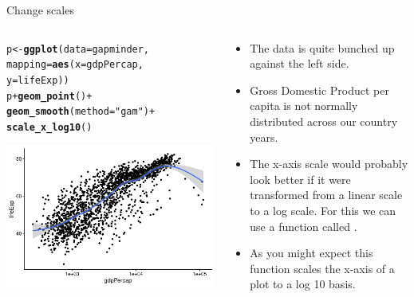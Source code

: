\documentclass[10pt,handout]{beamer}\usepackage[]{graphicx}\usepackage[]{color}
\makeatletter
\def\maxwidth{ %
  \ifdim\Gin@nat@width>\linewidth
    \linewidth
  \else
    \Gin@nat@width
  \fi
}
\newcommand{\hlstr}[1]{\textcolor[rgb]{0.192,0.494,0.8}{#1}}%
\newcommand{\hlopt}[1]{\textcolor[rgb]{0,0,0}{#1}}%
\newcommand{\hlstd}[1]{\textcolor[rgb]{0.345,0.345,0.345}{#1}}%
\newcommand{\hlkwb}[1]{\textcolor[rgb]{0.69,0.353,0.396}{#1}}%
\newcommand{\hlkwc}[1]{\textcolor[rgb]{0.333,0.667,0.333}{#1}}%
\newcommand{\hlkwd}[1]{\textcolor[rgb]{0.737,0.353,0.396}{\textbf{#1}}}%
\newenvironment{kframe}{%
 \def\at@end@of@kframe{}%
 \ifinner\ifhmode%
  \def\at@end@of@kframe{\end{minipage}}%
  \begin{minipage}{\columnwidth}%
 \fi\fi%
 \def\FrameCommand##1{\hskip\@totalleftmargin \hskip-\fboxsep
 \colorbox{shadecolor}{##1}\hskip-\fboxsep
     \hskip-\linewidth \hskip-\@totalleftmargin \hskip\columnwidth}%
 \MakeFramed {\advance\hsize-\width
   \@totalleftmargin\z@ \linewidth\hsize
   \@setminipage}}%
 {\par\unskip\endMakeFramed%
 \at@end@of@kframe}
\newenvironment{knitrout}{}{} %
\makeatother
\begin{document}
\begin{frame}[fragile]{Change scales}
	\begin{columns}
		\begin{column}{0.5\textwidth}  %
\begin{knitrout}\tiny
{}\color{fgcolor}\begin{kframe}
\begin{alltt}
\hlstd{p} \hlkwb{<-} \hlkwd{ggplot}\hlstd{(}\hlkwc{data} \hlstd{= gapminder,}
        \hlkwc{mapping} \hlstd{=} \hlkwd{aes}\hlstd{(}\hlkwc{x} \hlstd{= gdpPercap,}
                \hlkwc{y}\hlstd{=lifeExp))}
\hlstd{p} \hlopt{+} \hlkwd{geom_point}\hlstd{()} \hlopt{+}
        \hlkwd{geom_smooth}\hlstd{(}\hlkwc{method} \hlstd{=} \hlstr{"gam"}\hlstd{)} \hlopt{+}
        \hlkwd{scale_x_log10}\hlstd{()}
\end{alltt}


{\ttfamily\noindent\itshape{}}\end{kframe}

{\centering \includegraphics[width=\maxwidth]{figure/unnamed-chunk-9-1} 

}


\end{knitrout}
		\end{column}\pause 
		\begin{column}{0.5\textwidth}
			\begin{itemize}
				\item The data is quite bunched up against the left side. 
				\item Gross Domestic Product per capita is not normally distributed across our country years. 
				\item The x-axis scale would probably look better if it were transformed from a linear scale to a log scale. For this we can use a function called . 
				\item As you might expect this function scales the x-axis of a plot to a log 10 basis. 
			\end{itemize}
		\end{column}
	\end{columns}
\end{frame}
\end{document}
